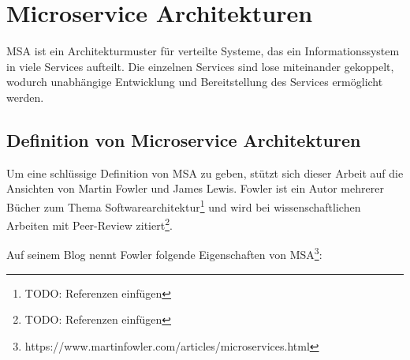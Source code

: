 \newpage
\section{Microservice Architekturen} \label{msa}


MSA ist ein Architekturmuster für verteilte Systeme, das ein Informationssystem
in viele Services aufteilt. Die einzelnen Services sind lose miteinander
gekoppelt, wodurch unabhängige Entwicklung und Bereitstellung des Services
ermöglicht werden.

\subsection{Definition von Microservice Architekturen}

Um eine schlüssige Definition von MSA zu geben, stützt sich dieser Arbeit auf
die Ansichten von Martin Fowler und James Lewis. Fowler ist ein Autor mehrerer Bücher zum Thema
Softwarearchitektur\footnote{TODO: Referenzen einfügen} und wird bei
wissenschaftlichen Arbeiten mit Peer-Review zitiert\footnote{TODO: Referenzen
einfügen}.

Auf seinem Blog nennt Fowler folgende Eigenschaften von
MSA\footnote{https://www.martinfowler.com/articles/microservices.html}:

